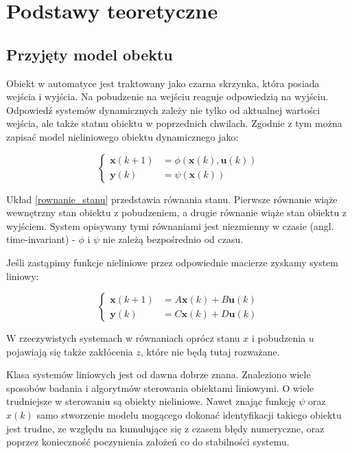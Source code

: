 \documentclass{article}
\newcommand{\bb}{\textbf}
\begin{document}
\section{Podstawy teoretyczne}

\subsection{Przyjęty model obektu}

Obiekt w automatyce jest traktowany jako czarna skrzynka, która posiada wejścia i wyjścia. Na pobudzenie na wejściu reaguje odpowiedzią na wyjściu. Odpowiedź systemów dynamicznych zależy nie tylko od aktualnej wartości wejścia, ale także statnu obiektu w poprzednich chwilach. Zgodnie z tym można zapisać model nieliniowego obiektu dynamicznego jako:

\begin{equation}
\left\{
\begin{array}{ll}
	\bb{x}(k+1) &= \phi (\bb{x}(k), \bb{u}(k)) \\
	\bb{y}(k)   &= \psi (\bb{x}(k))
\end{array} \right.
\label{rownanie_stanu}
\end{equation}

Układ \ref{rownanie_stanu} przedstawia równania stanu. Pierwsze równanie wiąże wewnętrzny stan obiektu z pobudzeniem, a drugie równanie wiąże stan obiektu z wyjściem. System opisywany tymi równaniami jest niezmienny w czasie (angl. time-invariant) - $\phi$ i $\psi$ nie zależą bezpośrednio od czasu.

Jeśli zastąpimy funkcje nieliniowe przez odpowiednie macierze zyskamy system liniowy:

\begin{equation}
\left\{
\begin{array}{ll}
	\bb{x}(k+1) &= A\bb{x}(k) + B\bb{u}(k) \\
	\bb{y}(k)   &= C\bb{x}(k) + D\bb{u}(k)
\end{array} \right.
\end{equation}

W rzeczywistych systemach w równaniach oprócz stanu $x$ i pobudzenia $u$ pojawiają się także zakłócenia $z$, które nie będą tutaj rozważane.

Klasa systemów liniowych jest od dawna dobrze znana. Znaleziono wiele sposobów badania i algorytmów sterowania obiektami liniowymi. O wiele trudniejsze w sterowaniu są obiekty nieliniowe. Nawet znając funkcję $\psi$ oraz $x(k)$ samo stworzenie modelu mogącego dokonać identyfikacji takiego obiektu jest trudne, ze względu na kumulujące się z czasem błędy numeryczne, oraz poprzez konieczność poczynienia założeń co do stabilności systemu.
\end{document}

